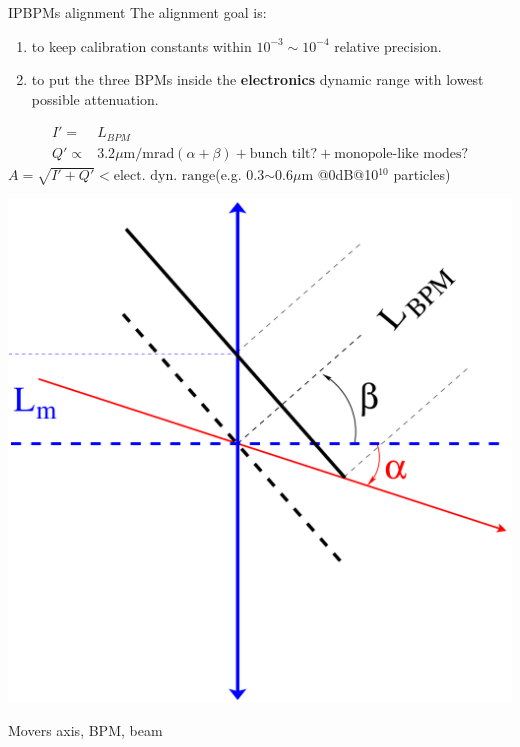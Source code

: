 \documentclass{beamer}
\begin{document}
\begin{frame}{IPBPMs alignment}
  The alignment goal is:
 \begin{enumerate}
  \item to keep calibration constants within $10^{-3}\sim10^{-4}$ relative precision.
  \item to put the three BPMs inside the \textbf{electronics} dynamic range with lowest possible attenuation.
 \end{enumerate}
 \begin{align*}
 I'=&L_{BPM}\\
 Q'\propto& 3.2\mu\text{m/mrad}(\alpha+\beta)+\text{bunch tilt?}+\text{monopole-like modes?}
\end{align*}
$A=\sqrt{I'+Q'}<\text{elect. dyn. range}$(e.g. 0.3$\sim$0.6$\mu$m @0dB@10$^{10}$ particles)\par\centering
\includegraphics[scale=0.12]{BPMcal.pdf}\par
 {\color{blue} Movers axis}, BPM, {\color{red} beam}\par
\end{frame}
\end{document}
